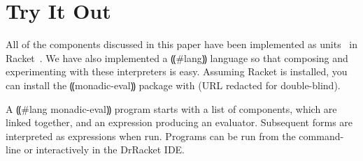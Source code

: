 \section{Try It Out}\label{s:try-it}

All of the components discussed in this paper have been implemented as
units~\cite{local:flatt-pldi98} in Racket~\cite{dvanhorn:plt-tr1}.  We have
also implemented a ⸨#lang⸩ language so that composing and experimenting with
these interpreters is easy.  Assuming Racket is installed, you can install the
⸨monadic-eval⸩ package with (URL redacted for double-blind).

A ⸨#lang monadic-eval⸩ program starts with a list of components, which are
linked together, and an expression producing an evaluator.  Subsequent forms
are interpreted as expressions when run. Programs can be run from the
command-line or interactively in the DrRacket IDE.
